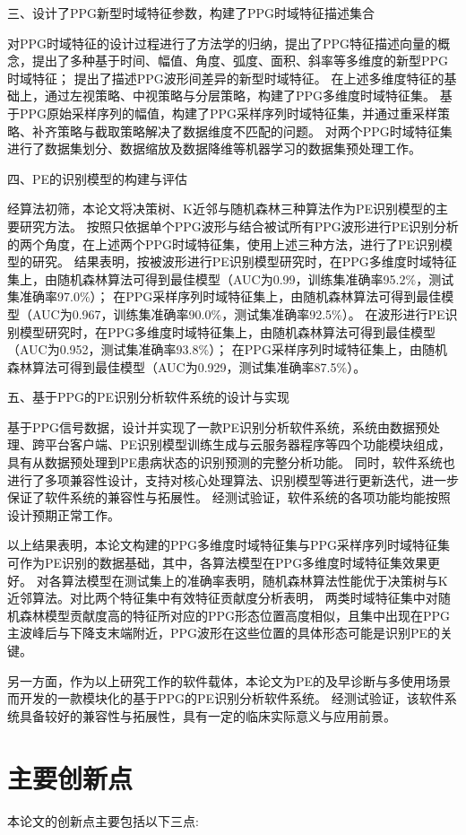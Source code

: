 三、设计了PPG新型时域特征参数，构建了PPG时域特征描述集合

对PPG时域特征的设计过程进行了方法学的归纳，提出了PPG特征描述向量的概念，提出了多种基于时间、幅值、角度、弧度、面积、斜率等多维度的新型PPG时域特征；
提出了描述PPG波形间差异的新型时域特征。
在上述多维度特征的基础上，通过左视策略、中视策略与分层策略，构建了PPG多维度时域特征集。
基于PPG原始采样序列的幅值，构建了PPG采样序列时域特征集，并通过重采样策略、补齐策略与截取策略解决了数据维度不匹配的问题。
对两个PPG时域特征集进行了数据集划分、数据缩放及数据降维等机器学习的数据集预处理工作。

四、PE的识别模型的构建与评估

经算法初筛，本论文将决策树、K近邻与随机森林三种算法作为PE识别模型的主要研究方法。
按照只依据单个PPG波形与结合被试所有PPG波形进行PE识别分析的两个角度，在上述两个PPG时域特征集，使用上述三种方法，进行了PE识别模型的研究。
结果表明，按被波形进行PE识别模型研究时，在PPG多维度时域特征集上，由随机森林算法可得到最佳模型（AUC为0.99，训练集准确率95.2\%，测试集准确率97.0\%）；
在PPG采样序列时域特征集上，由随机森林算法可得到最佳模型（AUC为0.967，训练集准确率90.0\%，测试集准确率92.5\%）。
在波形进行PE识别模型研究时，在PPG多维度时域特征集上，由随机森林算法可得到最佳模型（AUC为0.952，测试集准确率93.8\%）；
在PPG采样序列时域特征集上，由随机森林算法可得到最佳模型（AUC为0.929，测试集准确率87.5\%）。

五、基于PPG的PE识别分析软件系统的设计与实现

基于PPG信号数据，设计并实现了一款PE识别分析软件系统，系统由数据预处理、跨平台客户端、PE识别模型训练生成与云服务器程序等四个功能模块组成，
具有从数据预处理到PE患病状态的识别预测的完整分析功能。
同时，软件系统也进行了多项兼容性设计，支持对核心处理算法、识别模型等进行更新迭代，进一步保证了软件系统的兼容性与拓展性。
经测试验证，软件系统的各项功能均能按照设计预期正常工作。

以上结果表明，本论文构建的PPG多维度时域特征集与PPG采样序列时域特征集可作为PE识别的数据基础，其中，各算法模型在PPG多维度时域特征集效果更好。
对各算法模型在测试集上的准确率表明，随机森林算法性能优于决策树与K近邻算法。对比两个特征集中有效特征贡献度分析表明，
两类时域特征集中对随机森林模型贡献度高的特征所对应的PPG形态位置高度相似，且集中出现在PPG主波峰后与下降支末端附近，PPG波形在这些位置的具体形态可能是识别PE的关键。

另一方面，作为以上研究工作的软件载体，本论文为PE的及早诊断与多使用场景而开发的一款模块化的基于PPG的PE识别分析软件系统。
经测试验证，该软件系统具备较好的兼容性与拓展性，具有一定的临床实际意义与应用前景。
\section{主要创新点}
本论文的创新点主要包括以下三点:

